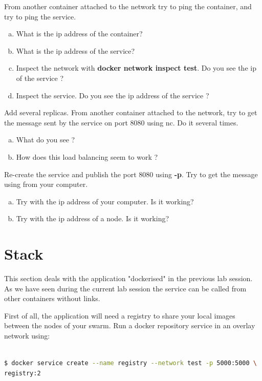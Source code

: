 \documentclass[a4paper,11pt]{exam}
\begin{document}
\begin{questions}
	\question From another container attached to the network try to ping the container, and try to ping the service.
	\begin{enumerate}[(a)]
		\item What is the ip address of the container?
		\item What is the ip address of the service?
		\item Inspect the network with \textbf{docker network inspect test}. Do you see the ip of the service ?
		\item Inspect the service. Do you see the ip address of the service ?
	\end{enumerate}

	\question Add several replicas. From another container attached to the network, try to get the message sent by the service on port 8080 using nc. Do it several times.
	\begin{enumerate}[(a)]
		\item What do you see ?
		\item How does this load balancing seem to work ?
	\end{enumerate}

	\question Re-create the service and publish the port 8080 using \textbf{-p}. Try to get the message using from your computer.
	\begin{enumerate}[(a)]
		\item Try with the ip address of your computer. Is it working?
		\item Try with the ip address of a node. Is it working?
	\end{enumerate}
\end{questions}


\section{Stack}

This section deals with the application "dockerised" in the previous lab session. As we have seen during the current lab session the service can be called from other containers without links.

First of all, the application will need a registry to share your local images between the nodes of your swarm.
Run a docker repository service in an overlay network using: 

\begin{lstlisting}[frame=single,language={sh}]  % Start your code-block

$ docker service create --name registry --network test -p 5000:5000 \
registry:2
\end{lstlisting}
\end{document}
